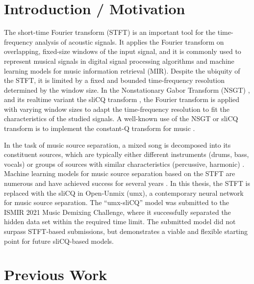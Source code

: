 \documentclass[letter,12pt]{scrartcl}
\title{\ThesisTitle}
\author{Sevag Hanssian, sevag.hanssian@mail.mcgill.ca}
\begin{document}
\maketitle

\section{Introduction / Motivation}

The short-time Fourier transform (STFT) is an important tool for the time-frequency analysis of acoustic signals. It applies the Fourier transform on overlapping, fixed-size windows of the input signal, and it is commonly used to represent musical signals in digital signal processing algorithms and machine learning models for music information retrieval (MIR). Despite the ubiquity of the STFT, it is limited by a fixed and bounded time-frequency resolution determined by the window size. In the Nonstationary Gabor Transform (NSGT) \cite{balazs}, and its realtime variant the sliCQ transform \cite{invertiblecqt}, the Fourier transform is applied with varying window sizes to adapt the time-frequency resolution to fit the characteristics of the studied signals. A well-known use of the NSGT or sliCQ transform is to implement the constant-Q transform for music \cite{jbrown, klapuricqt}.

In the task of music source separation, a mixed song is decomposed into its constituent sources, which are typically either different instruments (drums, bass, vocals) or groups of sources with similar characteristics (percussive, harmonic) \cite{musicsepgood}. Machine learning models for music source separation based on the STFT are numerous and have achieved success for several years \cite{sisec2018}. In this thesis, the STFT is replaced with the sliCQ in Open-Unmix (umx), a contemporary neural network \cite{umx} for music source separation. The ``umx-sliCQ'' model was submitted to the ISMIR 2021 Music Demixing Challenge, where it successfully separated the hidden data set within the required time limit. The submitted model did not surpass STFT-based submissions, but demonstrates a viable and flexible starting point for future sliCQ-based models.

\section{Previous Work}
\end{document}
